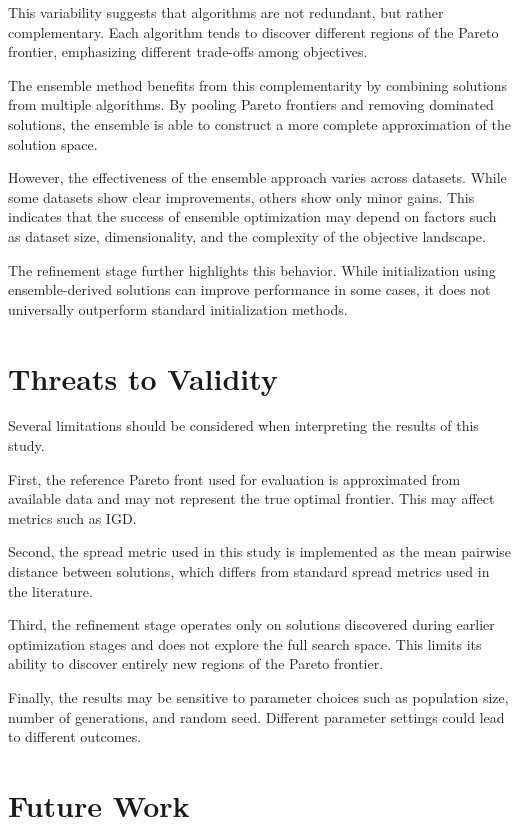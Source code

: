 \documentclass[sigconf,authorversion,nonacm]{acmart}
\begin{document}
This variability suggests that algorithms are not redundant, but rather 
complementary. Each algorithm tends to discover different regions of the 
Pareto frontier, emphasizing different trade-offs among objectives.

The ensemble method benefits from this complementarity by combining 
solutions from multiple algorithms. By pooling Pareto frontiers and 
removing dominated solutions, the ensemble is able to construct a more 
complete approximation of the solution space.

However, the effectiveness of the ensemble approach varies across 
datasets. While some datasets show clear improvements, others show only 
minor gains. This indicates that the success of ensemble optimization 
may depend on factors such as dataset size, dimensionality, and the 
complexity of the objective landscape.

The refinement stage further highlights this behavior. While 
initialization using ensemble-derived solutions can improve performance 
in some cases, it does not universally outperform standard initialization 
methods.

\section{Threats to Validity}

Several limitations should be considered when interpreting the results 
of this study.

First, the reference Pareto front used for evaluation is approximated 
from available data and may not represent the true optimal frontier. 
This may affect metrics such as IGD.

Second, the spread metric used in this study is implemented as the mean 
pairwise distance between solutions, which differs from standard spread 
metrics used in the literature.

Third, the refinement stage operates only on solutions discovered during 
earlier optimization stages and does not explore the full search space. 
This limits its ability to discover entirely new regions of the Pareto 
frontier.

Finally, the results may be sensitive to parameter choices such as 
population size, number of generations, and random seed. Different 
parameter settings could lead to different outcomes.

\section{Future Work}
\end{document}
